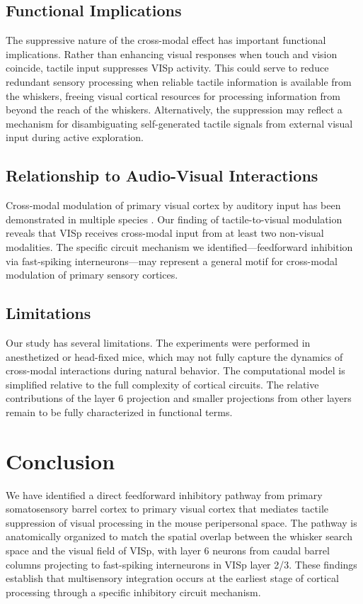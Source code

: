 \documentclass[11pt]{article}
\begin{document}
\subsection{Functional Implications}

The suppressive nature of the cross-modal effect has important functional implications. Rather than enhancing visual responses when touch and vision coincide, tactile input suppresses VISp activity. This could serve to reduce redundant sensory processing when reliable tactile information is available from the whiskers, freeing visual cortical resources for processing information from beyond the reach of the whiskers. Alternatively, the suppression may reflect a mechanism for disambiguating self-generated tactile signals from external visual input during active exploration.

\subsection{Relationship to Audio-Visual Interactions}

Cross-modal modulation of primary visual cortex by auditory input has been demonstrated in multiple species \citep{iurilli2012sound}. Our finding of tactile-to-visual modulation reveals that VISp receives cross-modal input from at least two non-visual modalities. The specific circuit mechanism we identified---feedforward inhibition via fast-spiking interneurons---may represent a general motif for cross-modal modulation of primary sensory cortices.

\subsection{Limitations}

Our study has several limitations. The experiments were performed in anesthetized or head-fixed mice, which may not fully capture the dynamics of cross-modal interactions during natural behavior. The computational model is simplified relative to the full complexity of cortical circuits. The relative contributions of the layer 6 projection and smaller projections from other layers remain to be fully characterized in functional terms.

\section{Conclusion}

We have identified a direct feedforward inhibitory pathway from primary somatosensory barrel cortex to primary visual cortex that mediates tactile suppression of visual processing in the mouse peripersonal space. The pathway is anatomically organized to match the spatial overlap between the whisker search space and the visual field of VISp, with layer 6 neurons from caudal barrel columns projecting to fast-spiking interneurons in VISp layer 2/3. These findings establish that multisensory integration occurs at the earliest stage of cortical processing through a specific inhibitory circuit mechanism.



\end{document}
